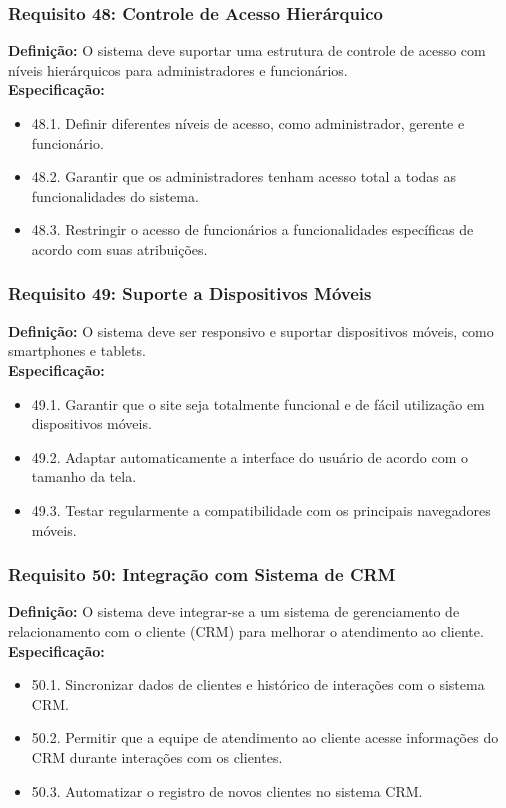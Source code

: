 \subsubsection{Requisito 48: Controle de Acesso Hierárquico}
\textbf{Definição:} O sistema deve suportar uma estrutura de controle de acesso com níveis hierárquicos para administradores e funcionários.
\\
\textbf{Especificação:}
\begin{itemize}
	\item 48.1. Definir diferentes níveis de acesso, como administrador, gerente e funcionário.
	\item 48.2. Garantir que os administradores tenham acesso total a todas as funcionalidades do sistema.
	\item 48.3. Restringir o acesso de funcionários a funcionalidades específicas de acordo com suas atribuições.
\end{itemize}

\subsubsection{Requisito 49: Suporte a Dispositivos Móveis}
\textbf{Definição:} O sistema deve ser responsivo e suportar dispositivos móveis, como smartphones e tablets.
\\
\textbf{Especificação:}
\begin{itemize}
	\item 49.1. Garantir que o site seja totalmente funcional e de fácil utilização em dispositivos móveis.
	\item 49.2. Adaptar automaticamente a interface do usuário de acordo com o tamanho da tela.
	\item 49.3. Testar regularmente a compatibilidade com os principais navegadores móveis.
\end{itemize}

\subsubsection{Requisito 50: Integração com Sistema de CRM}
\textbf{Definição:} O sistema deve integrar-se a um sistema de gerenciamento de relacionamento com o cliente (CRM) para melhorar o atendimento ao cliente.
\\
\textbf{Especificação:}
\begin{itemize}
	\item 50.1. Sincronizar dados de clientes e histórico de interações com o sistema CRM.
	\item 50.2. Permitir que a equipe de atendimento ao cliente acesse informações do CRM durante interações com os clientes.
	\item 50.3. Automatizar o registro de novos clientes no sistema CRM.
\end{itemize}

